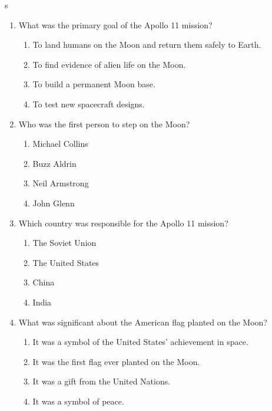 s\documentclass[12pt]{article}
\begin{document}
\begin{enumerate}
    \item What was the primary goal of the Apollo 11 mission?
    \begin{enumerate}[label=\Alph*.]
        \item To land humans on the Moon and return them safely to Earth.
        \item To find evidence of alien life on the Moon.
        \item To build a permanent Moon base.
        \item To test new spacecraft designs.
    \end{enumerate}
    \vspace{0.5cm}

    \item Who was the first person to step on the Moon?
    \begin{enumerate}[label=\Alph*.]
        \item Michael Collins
        \item Buzz Aldrin
        \item Neil Armstrong
        \item John Glenn
    \end{enumerate}
    \vspace{0.5cm}

    \item Which country was responsible for the Apollo 11 mission?
    \begin{enumerate}[label=\Alph*.]
        \item The Soviet Union
        \item The United States
        \item China
        \item India
    \end{enumerate}
    \vspace{0.5cm}

    \item What was significant about the American flag planted on the Moon?
    \begin{enumerate}[label=\Alph*.]
        \item It was a symbol of the United States' achievement in space.
        \item It was the first flag ever planted on the Moon.
        \item It was a gift from the United Nations.
        \item It was a symbol of peace.
    \end{enumerate}
    \vspace{0.5cm}


\end{enumerate}
\end{document}
